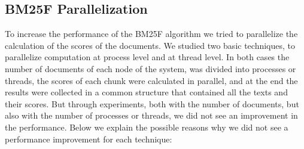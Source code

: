 \documentclass{article}
\begin{document}
\subsection{BM25F Parallelization}
To increase the performance of the BM25F algorithm we tried to parallelize the calculation of the 
scores of the documents. We studied two basic techniques, to parallelize computation at process 
level and at thread level. In both cases the number of documents of each node of the system, was 
divided into processes or threads, the scores of each chunk were calculated in parallel, and at 
the end the results were collected in a common structure that contained all the texts and their 
scores. But through experiments, both with the number of documents, but also with the number of 
processes or threads, we did not see an improvement in the performance. Below we explain the 
possible reasons why we did not see a performance improvement for each technique:
\end{document}
